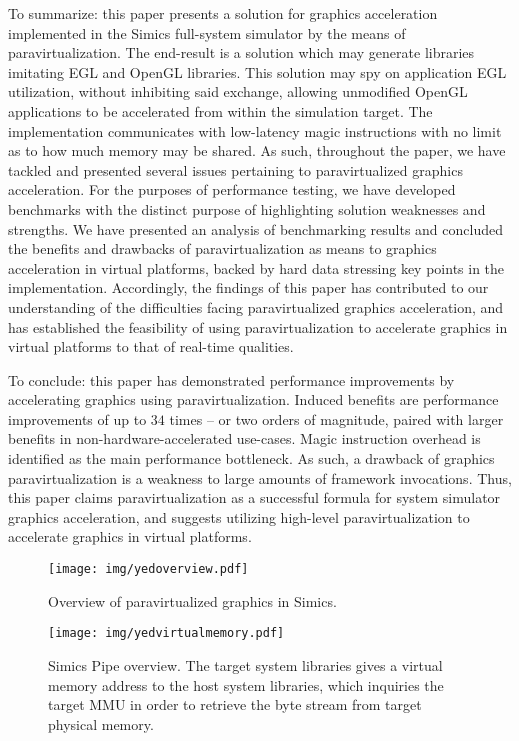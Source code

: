 \documentclass{article}
\begin{document}
To summarize: this paper presents a solution for graphics acceleration implemented in the Simics full-system simulator by the means of paravirtualization.
The end-result is a solution which may generate libraries imitating EGL and OpenGL libraries.
This solution may spy on application EGL utilization, without inhibiting said exchange, allowing unmodified OpenGL applications to be accelerated from within the simulation target.
The implementation communicates with low-latency magic instructions with no limit as to how much memory may be shared.
As such, throughout the paper, we have tackled and presented several issues pertaining to paravirtualized graphics acceleration.
For the purposes of performance testing, we have developed benchmarks with the distinct purpose of highlighting solution weaknesses and strengths.
We have presented an analysis of benchmarking results and concluded the benefits and drawbacks of paravirtualization as means to graphics acceleration in virtual platforms, backed by hard data stressing key points in the implementation.
Accordingly, the findings of this paper has contributed to our understanding of the difficulties facing paravirtualized graphics acceleration, and has established the feasibility of using paravirtualization to accelerate graphics in virtual platforms to that of real-time qualities.

To conclude: this paper has demonstrated performance improvements by accelerating graphics using paravirtualization.
Induced benefits are performance improvements of up to $34$ times -- or two orders of magnitude, paired with larger benefits in non-hardware-accelerated use-cases.
Magic instruction overhead is identified as the main performance bottleneck.
As such, a drawback of graphics paravirtualization is a weakness to large amounts of framework invocations.
Thus, this paper claims paravirtualization as a successful formula for system simulator graphics acceleration, and suggests utilizing high-level paravirtualization to accelerate graphics in virtual platforms.

\begin{figure}
\centering
\texttt{[image: img/yedoverview.pdf]}
\caption{Overview of paravirtualized graphics in Simics.}
\label{fig:overview}
\end{figure}

\begin{figure}
\centering
\texttt{[image: img/yedvirtualmemory.pdf]}
\caption{Simics Pipe overview. The target system libraries gives a virtual memory address to the host system libraries, which inquiries the target MMU in order to retrieve the byte stream from target physical memory.}
\label{fig:virtualmemory}
\end{figure}
\end{document}
